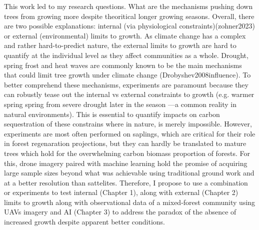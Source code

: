 \documentclass[12pt]{article}
\begin{document}
\par
This work led to my research questions. What are the mechanisms pushing down trees from growing more despite theoritical longer growing seasons. Overall, there are two possible explanations: internal (via physiological constraints)(zohner2023) or external (environmental) limits to growth. As climate change has a complex and rather hard-to-predict nature, the external limits to growth are hard to quantify at the individual level as they affect communities as a whole. Drought, spring frost and heat waves are commonly known to be the main mechanisms that could limit tree growth under climate change (Drobyshev2008influence). To better comprehend these mechanisms, experiments are paramount because they can robustly tease out the internal vs external constraints to growth (e.g. warmer spring spring from severe drought later in the season ---a common reality in natural environments). This is essential to quantify impacts on carbon sequestration of these constrains where in nature, is merely impossible. However, experiments are most often performed on saplings, which are critical for their role in forest regenaration projections, but they can hardly be translated to mature trees which hold for the overwhelming carbon biomass proportion of forests. For this, drone imagery paired with machine learning hold the promise of acquiring large sample sizes beyond what was achievable using traditional ground work and at a better resolution than sattelites. Therefore, I propose to use a combination or experiments to test internal (Chapter 1), along with external (Chapter 2) limits to growth along with observational data of a mixed-forest community using UAVs imagery and AI (Chapter 3) to address the paradox of the absence of increased growth despite apparent better conditions.   \\

\end{document}
